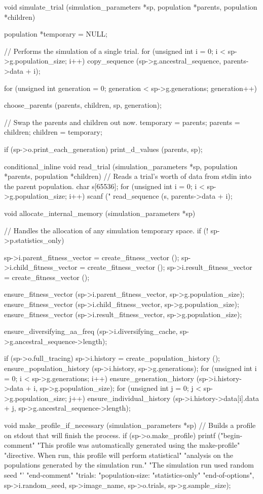 \documentclass{article}
\begin{document}
\begin{ccode}
void simulate_trial (simulation_parameters *sp, population *parents, population *children) {
  population *temporary = NULL;

  // Performs the simulation of a single trial.
  for (unsigned int i = 0; i < sp->g.population_size; i++)
    copy_sequence (sp->g.ancestral_sequence, parents->data + i);

  for (unsigned int generation = 0; generation < sp->g.generations; generation++) {
    choose_parents (parents, children, sp, generation);

    // Swap the parents and children out now.
    temporary = parents;
    parents = children;
    children = temporary;

    if (sp->o.print_each_generation)
      print_d_values (parents, sp);
  }
}

conditional_inline void read_trial (simulation_parameters *sp, population *parents, population *children) {
  // Reads a trial's worth of data from stdin into the parent population.
  char s[65536];
  for (unsigned int i = 0; i < sp->g.population_size; i++) {
    scanf ("%
    read_sequence (s, parents->data + i);
  }
}

void allocate_internal_memory (simulation_parameters *sp) {
  // Handles the allocation of any simulation temporary space.
  if (! sp->p.statistics_only) {
    sp->i.parent_fitness_vector = create_fitness_vector ();
    sp->i.child_fitness_vector = create_fitness_vector ();
    sp->i.result_fitness_vector = create_fitness_vector ();

    ensure_fitness_vector (sp->i.parent_fitness_vector, sp->g.population_size);
    ensure_fitness_vector (sp->i.child_fitness_vector,  sp->g.population_size);
    ensure_fitness_vector (sp->i.result_fitness_vector, sp->g.population_size);
  }

  ensure_diversifying_aa_freq (sp->i.diversifying_cache, sp->g.ancestral_sequence->length);

  if (sp->o.full_tracing) {
    sp->i.history = create_population_history ();
    ensure_population_history (sp->i.history, sp->g.generations);
    for (unsigned int i = 0; i < sp->g.generations; i++) {
      ensure_generation_history (sp->i.history->data + i, sp->g.population_size);
      for (unsigned int j = 0; j < sp->g.population_size; j++)
	ensure_individual_history (sp->i.history->data[i].data + j, sp->g.ancestral_sequence->length);
    }
  }
}

void make_profile_if_necessary (simulation_parameters *sp) {
  // Builds a profile on stdout that will finish the process.
  if (sp->o.make_profile)
    printf ("begin-comment\n"
	    "This profile was automatically generated using the make-profile\n"
	    "directive. When run, this profile will perform statistical\n"
	    "analysis on the populations generated by the simulation run.\n"
	    "The simulation run used random seed %
	    "'%
	    "end-comment\n\n"
	    "trials: %
	    "population-size: %
	    "statistics-only\n"
	    "end-of-options\n",
	    sp->i.random_seed, sp->image_name, sp->o.trials, sp->g.sample_size);
}


\end{ccode}
\end{document}
